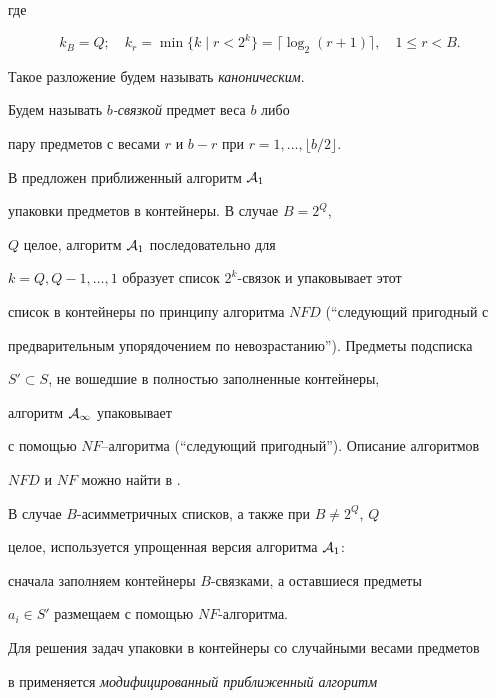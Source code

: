 где


$$


k_{B}=Q;\quad


k_{r}=\min \{k\mid r<2^{k}\}=\lceil \log_{2}{(r+1)} \rceil,


\quad 1 \le r<B.


$$


Такое разложение будем называть {\em каноническим}.





Будем называть {\em $b$-связкой} предмет веса $b$ либо


пару предметов с весами $r$ и $b-r$ при $r=1,\dotsc,\lfloor b/2 \rfloor$.





В \cite{GZ} предложен приближенный алгоритм ${\cal A}_{1}$


упаковки предметов в контейнеры. В случае $B=2^{Q}$,


$Q$ целое, алгоритм ${\cal A}_{1}$ последовательно для


$k=Q,Q-1,\dotsc,1$ образует список $2^{k}$-связок и упаковывает этот 


список в контейнеры по принципу алгоритма $NFD$ (``следующий пригодный с 


предварительным упорядочением по невозрастанию''). Предметы подсписка


$S'\subset S$, не вошедшие в полностью заполненные контейнеры,


алгоритм $\cal A_1$ упаковывает


с помощью $NF$--алгоритма (``следующий пригодный''). Описание алгоритмов


$NFD$ и $NF$ можно найти в \cite{CGJ}.





В случае $B$-асимметричных списков, а также при $B \ne 2^{Q}$, $Q$


целое, используется упрощенная версия алгоритма ${\cal A}_{1}$: 


сначала заполняем контейнеры $B$-связками, а оставшиеся предметы 


$a_{i} \in S'$ размещаем с помощью $NF$-алгоритма.





Для решения задач упаковки в контейнеры со случайными весами предметов


в \cite{GZ} применяется {\em модифицированный приближенный алгоритм} 


